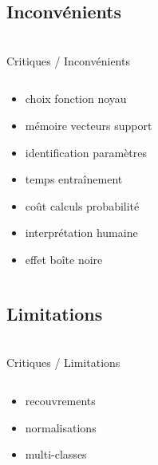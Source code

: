 \subsection{Inconvénients}
\begin{frame}{\bititle\\Critiques / Inconvénients}
\begin{columns}\begin{column}{.5\textwidth}

\begin{itemize}
\item<1-> choix fonction noyau
\item<2-> mémoire vecteurs support
\item<3-> identification paramètres
\item<4-> temps entraînement
\item<5-> coût calculs probabilité
\item<6-> interprétation humaine
\item<7-> effet boîte noire
\end{itemize}

\end{column}\begin{column}{.5\textwidth}


\end{column}\end{columns}
\end{frame}
\subsection{Limitations}
\begin{frame}{\bititle\\Critiques / Limitations}
\begin{columns}\begin{column}{.5\textwidth}

\begin{itemize}
\item<1-> recouvrements
\item<2-> normalisations
\item<3-> multi-classes
\end{itemize}

\end{column}\begin{column}{.5\textwidth}


\end{column}\end{columns}
\end{frame}

